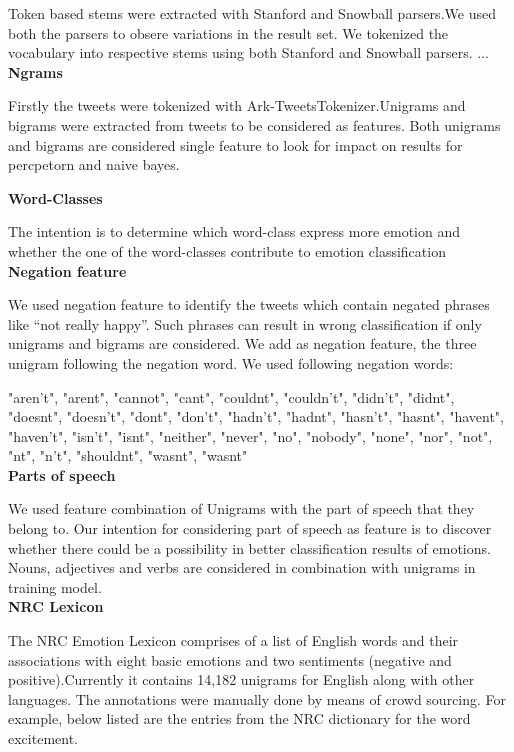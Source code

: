 \documentclass[11pt]{article}
\begin{document}
Token based stems were extracted with Stanford and Snowball parsers.We used both the parsers to obsere variations in the result set. We tokenized the vocabulary into respective stems using both Stanford and Snowball parsers.
...\\


{\bf Ngrams}

Firstly the tweets were tokenized with Ark-TweetsTokenizer.Unigrams and bigrams were extracted from tweets to be considered as features. Both unigrams and bigrams are considered single feature to look for impact on results for percpetorn and naive bayes.


{\bf Word-Classes}


The intention is to determine which word-class express more emotion and whether the one of the word-classes contribute to emotion classification\\


{\bf Negation feature}


We used negation feature to identify the tweets which contain negated phrases like “not really happy”. Such phrases can result in wrong
classification if only unigrams and bigrams are considered. We add as negation feature, the three unigram following the negation word. We used
following negation words:

"aren’t", "arent", "cannot", "cant", "couldnt", "couldn’t", "didn’t", "didnt", "doesnt", "doesn’t", "dont", "don’t", "hadn’t", "hadnt", "hasn’t",
"hasnt", "havent", "haven’t", "isn’t", "isnt", "neither", "never", "no", "nobody", "none", "nor", "not", "nt", "n’t", "shouldnt", "wasnt", "wasnt"\\

{\bf Parts of speech}


We used feature combination of Unigrams with the part of speech that they belong to. Our intention for considering part of speech as feature is to discover
whether there could be a possibility in better classification results of emotions. Nouns, adjectives and verbs are considered in combination
with unigrams in training model. \\

{\bf NRC Lexicon}

The NRC Emotion Lexicon comprises of a list of English words and their associations with eight basic emotions and two sentiments (negative and
positive).Currently it contains 14,182 unigrams for English along with other languages.  The annotations were manually done by means of crowd sourcing. For example, below listed are the entries from the NRC dictionary for the word excitement.\\
\end{document}

